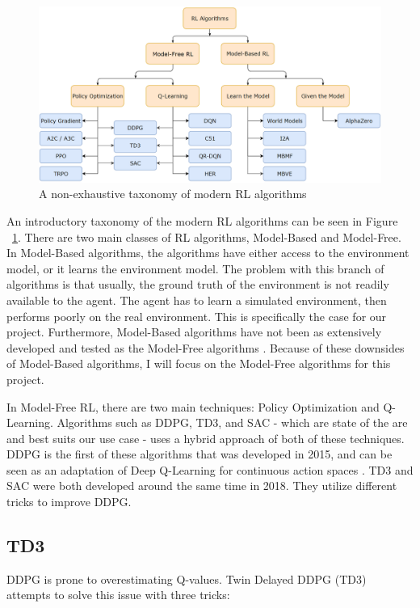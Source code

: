 \documentclass[12pt,twoside]{report}
\begin{document}
\begin{figure}[h]
\centering
\includegraphics[width = \hsize]{figures/RL algorithms.png}
\caption{A non-exhaustive taxonomy of modern RL algorithms \cite{openai:rl-algs}}
\label{fig:rl-algs}
\end{figure}

An introductory taxonomy of the modern RL algorithms can be seen in Figure ~\ref{fig:rl-algs}. There are two main classes of RL algorithms, Model-Based and Model-Free. In Model-Based algorithms, the algorithms have either access to the environment model, or it learns the environment model. The problem with this branch of algorithms is that usually, the ground truth of the environment is not readily available to the agent. The agent has to learn a simulated environment, then performs poorly on the real environment. This is specifically the case for our project. Furthermore, Model-Based algorithms have not been as extensively developed and tested as the Model-Free algorithms \cite{openai:rl-algs}. Because of these downsides of Model-Based algorithms, I will focus on the Model-Free algorithms for this project.

In Model-Free RL, there are two main techniques: Policy Optimization and Q-Learning. Algorithms such as DDPG, TD3, and SAC - which are state of the are and best suits our use case - uses a hybrid approach of both of these techniques.
DDPG is the first of these algorithms that was developed in 2015, and can be seen as an adaptation of Deep Q-Learning for continuous action spaces \cite{ddpg}. TD3 and SAC were both developed around the same time in 2018. They utilize different tricks to improve DDPG.

\subsection{TD3}
DDPG is prone to overestimating Q-values. Twin Delayed DDPG (TD3) attempts to solve this issue with three tricks: \cite{openai:td3}
\end{document}
